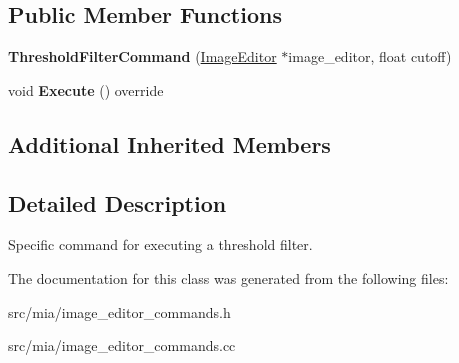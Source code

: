 \subsection*{Public Member Functions}
\begin{DoxyCompactItemize}
\item 
\mbox{\label{classimage__tools_1_1ThresholdFilterCommand_ad9c85f7a43fa67c02a0057513e22bcc2}} 
{\bfseries Threshold\+Filter\+Command} (\hyperlink{classimage__tools_1_1ImageEditor}{Image\+Editor} $\ast$image\+\_\+editor, float cutoff)
\item 
\mbox{\label{classimage__tools_1_1ThresholdFilterCommand_ac8b75145fd088a50a5c0e6412c51a891}} 
void {\bfseries Execute} () override
\end{DoxyCompactItemize}
\subsection*{Additional Inherited Members}


\subsection{Detailed Description}
Specific command for executing a threshold filter. 

The documentation for this class was generated from the following files\+:\begin{DoxyCompactItemize}
\item 
src/mia/image\+\_\+editor\+\_\+commands.\+h\item 
src/mia/image\+\_\+editor\+\_\+commands.\+cc\end{DoxyCompactItemize}
